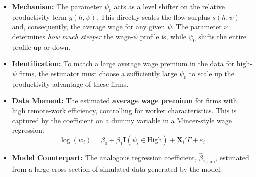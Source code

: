 \documentclass[
  11pt,
  letterpaper,
  DIV=11,
  numbers=noendperiod]{scrartcl}
\providecommand{\tightlist}{%
  \setlength{\itemsep}{0pt}\setlength{\parskip}{0pt}}\usepackage{longtable,booktabs,array}
\begin{document}
\begin{itemize}
\begin{enumerate}
    \begin{itemize}
    \tightlist
    \item
      \textbf{Mechanism:} The parameter \(\psi_{0}\) acts as a level
      shifter on the relative productivity term \(g(h, \psi)\). This
      directly scales the flow surplus \(s(h, \psi)\) and, consequently,
      the average wage for any given \(\psi\). The parameter \(\nu\)
      determines \emph{how much steeper} the wage-\(\psi\) profile is,
      while \(\psi_{0}\) shifts the entire profile up or down.
    \item
      \textbf{Identification:} To match a large average wage premium in
      the data for high-\(\psi\) firms, the estimator must choose a
      sufficiently large \(\psi_{0}\) to scale up the productivity
      advantage of these firms.
    \item
      \textbf{Data Moment:} The estimated \textbf{average wage premium}
      for firms with high remote-work efficiency, controlling for worker
      characteristics. This is captured by the coefficient on a dummy
      variable in a Mincer-style wage regression:
      \[\log(w_i) = \beta_0 + \beta_1 \mathbf{I}(\psi_i \in \text{High}) + \mathbf{X}_i'\Gamma + \varepsilon_i\]
    \item
      \textbf{Model Counterpart:} The analogous regression coefficient,
      \(\hat{\beta}_{1, \text{sim}}\), estimated from a large
      cross-section of simulated data generated by the model.
    \end{itemize}
  \end{enumerate}
\end{itemize}
\end{document}
